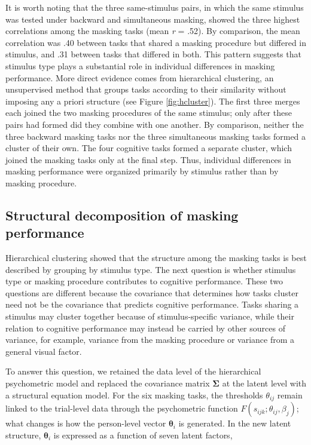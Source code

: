\documentclass[
  ,man]{apa6}
\begin{document}
It is worth noting that the three same-stimulus pairs, in which the same stimulus was tested under backward and simultaneous masking, showed the three highest correlations among the masking tasks (mean \emph{r} = .52). By comparison, the mean correlation was .40 between tasks that shared a masking procedure but differed in stimulus, and .31 between tasks that differed in both. This pattern suggests that stimulus type plays a substantial role in individual differences in masking performance. More direct evidence comes from hierarchical clustering, an unsupervised method that groups tasks according to their similarity without imposing any a priori structure (see Figure \ref{fig:hcluster}). The first three merges each joined the two masking procedures of the same stimulus; only after these pairs had formed did they combine with one another. By comparison, neither the three backward masking tasks nor the three simultaneous masking tasks formed a cluster of their own. The four cognitive tasks formed a separate cluster, which joined the masking tasks only at the final step. Thus, individual differences in masking performance were organized primarily by stimulus rather than by masking procedure.

\subsection{Structural decomposition of masking performance}\label{structural-decomposition-of-masking-performance}

Hierarchical clustering showed that the structure among the masking tasks is best described by grouping by stimulus type. The next question is whether stimulus type or masking procedure contributes to cognitive performance. These two questions are different because the covariance that determines how tasks cluster need not be the covariance that predicts cognitive performance. Tasks sharing a stimulus may cluster together because of stimulus-specific variance, while their relation to cognitive performance may instead be carried by other sources of variance, for example, variance from the masking procedure or variance from a general visual factor.

To answer this question, we retained the data level of the hierarchical psychometric model and replaced the covariance matrix \(\boldsymbol{\Sigma}\) at the latent level with a structural equation model. For the six masking tasks, the thresholds \(\theta_{ij}\) remain linked to the trial-level data through the psychometric function \(F(s_{ijk}; \theta_{ij}, \beta_j)\); what changes is how the person-level vector \(\boldsymbol{\theta}_i\) is generated. In the new latent structure, \(\boldsymbol{\theta}_i\) is expressed as a function of seven latent factors,
\end{document}

